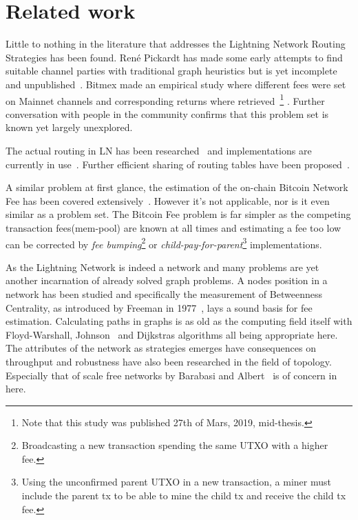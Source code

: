 \section{Related work}
    \label{sec:related_work}

	Little to nothing in the literature that addresses the Lightning Network Routing Strategies has been found. René Pickardt has made some early attempts to find suitable channel parties with traditional graph heuristics but is yet incomplete and unpublished~\cite{repository:rene:pickard}. Bitmex made an empirical study where different fees were set on Mainnet channels and corresponding returns where retrieved~\cite{bitmex:fee}\footnote{Note that this study was published 27th of Mars, 2019, mid-thesis.} . Further conversation with people in the community confirms that this problem set is known yet largely unexplored.
	
	The actual routing in LN has been researched~\cite{distasi:avallone:cononico:routing} and implementations are currently in use~\cite{repository:clightning, repository:lnd, repository:eclair, repository:lit}. Further efficient sharing of routing tables have been proposed~\cite{gunspan:marco:ant}.
	
	A similar problem at first glance, the estimation of the on-chain Bitcoin Network Fee has been covered extensively~\cite{mosterland:transaction:fee, houy:transaction:fee}. However it's not applicable, nor is it even similar as a problem set. The Bitcoin Fee problem is far simpler as the competing transaction fees(mem-pool) are known at all times and estimating a fee too low can be corrected by \textit{fee bumping}\footnote{Broadcasting a new transaction spending the same UTXO with a higher fee.} or \textit{child-pay-for-parent}\footnote{Using the unconfirmed parent UTXO in a new transaction, a miner must include the parent tx to be able to mine the child tx and receive the child tx fee.} implementations.
	
	As the Lightning Network is indeed a network and many problems are yet another incarnation of already solved graph problems. A nodes position in a network has been studied and specifically the measurement of Betweenness Centrality, as introduced by Freeman in 1977~\cite{brandes:betweenness:centrality:algorithm}, lays a sound basis for fee estimation. Calculating paths in graphs is as old as the computing field itself with Floyd-Warshall, Johnson~\cite{johnson:shortest:path:sparse:network} and Dijkstras algorithms all being appropriate here. The attributes of the network as strategies emerges have consequences on throughput and robustness have also been researched in the field of topology. Especially that of scale free networks by Barabasi and Albert~\cite{barabasi:albert:emergent:scaling} is of concern in here.
	
